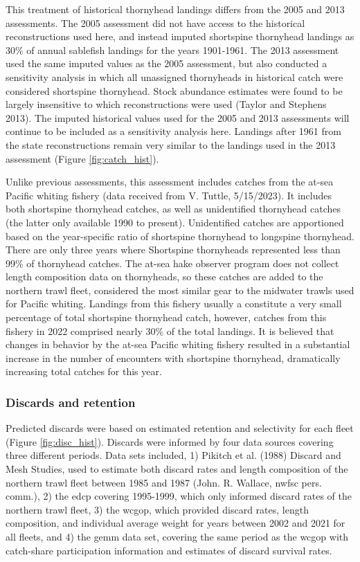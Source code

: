 \documentclass[11pt,
  letterpaper,
]{article}
\begin{document}
This treatment of historical thornyhead landings differs from the 2005 and 2013 assessments. The 2005 assessment did not have access to the historical reconstructions used here, and instead imputed shortspine thornyhead landings as 30\% of annual sablefish landings for the years 1901-1961. The 2013 assessment used the same imputed values as the 2005 assessment, but also conducted a sensitivity analysis in which all unassigned thornyheads in historical catch were considered shortspine thornyhead. Stock abundance estimates were found to be largely insensitive to which reconstructions were used (Taylor and Stephens 2013). The imputed historical values used for the 2005 and 2013 assessments will continue to be included as a sensitivity analysis here. Landings after 1961 from the state reconstructions remain very similar to the landings used in the 2013 assessment (Figure \ref{fig:catch_hist}).

Unlike previous assessments, this assessment includes catches from the at-sea Pacific whiting fishery (data received from V. Tuttle, 5/15/2023). It includes both shortspine thornyhead catches, as well as unidentified thornyhead catches (the latter only available 1990 to present). Unidentified catches are apportioned based on the year-specific ratio of shortspine thornyhead to longspine thornyhead. There are only three years where Shortspine thornyheads represented less than 99\% of thornyhead catches. The at-sea hake observer program does not collect length composition data on thornyheads, so these catches are added to the northern trawl fleet, considered the most similar gear to the midwater trawls used for Pacific whiting. Landings from this fishery usually a constitute a very small percentage of total shortspine thornyhead catch, however, catches from this fishery in 2022 comprised nearly 30\% of the total landings. It is believed that changes in behavior by the at-sea Pacific whiting fishery resulted in a substantial increase in the number of encounters with shortspine thornyhead, dramatically increasing total catches for this year.

\hypertarget{discards-and-retention}{%
\subsubsection{Discards and retention}\label{discards-and-retention}}

Predicted discards were based on estimated retention and selectivity for each fleet (Figure \ref{fig:disc_hist}). Discards were informed by four data sources covering three different periods. Data sets included, 1) Pikitch et al. (1988) Discard and Mesh Studies, used to estimate both discard rates and length composition of the northern trawl fleet between 1985 and 1987 (John. R. Wallace, \gls{nwfsc} pers. comm.), 2) the \gls{edcp} covering 1995-1999, which only informed discard rates of the northern trawl fleet, 3) the \gls{wcgop}, which provided discard rates, length composition, and individual average weight for years between 2002 and 2021 for all fleets, and 4) the \gls{gemm} data set, covering the same period as the \gls{wcgop} with catch-share participation information and estimates of discard survival rates.
\end{document}
